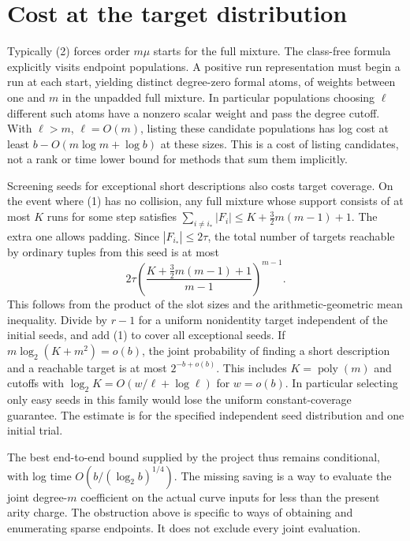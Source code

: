 \documentclass[11pt]{article}
\begin{document}
\section{Cost at the target distribution}
Typically (2) forces order $m\mu$ starts for the full mixture. The
class-free formula explicitly visits endpoint populations. A positive
run representation must begin a run at each start, yielding distinct
degree-zero formal atoms, of weights between one and $m$ in the
unpadded full mixture. In particular populations choosing $\ell$
different such atoms have a nonzero scalar weight and pass the degree
cutoff. With $\ell>m$, $\ell=O(m)$, listing these candidate populations
has log cost at least $b-O(m\log m+\log b)$ at these sizes. This is
a cost of listing candidates, not a rank or time lower bound for
methods that sum them implicitly.

Screening seeds for exceptional short descriptions also costs target
coverage. On the event where (1) has no collision, any full mixture
whose support consists of at most $K$ runs for some step satisfies
$\sum_{i\ne i_*}|F_i|\le K+\tfrac32m(m-1)+1$. The extra one allows
padding. Since $|F_{i_*}|\le2\tau$, the total number of targets
reachable by ordinary tuples from this seed is at most
\[
     2\tau\left(\frac{K+\tfrac32m(m-1)+1}{m-1}\right)^{m-1} .
\]
This follows from the product of the slot sizes and the
arithmetic-geometric mean inequality. Divide by $r-1$ for a uniform
nonidentity target independent of the initial seeds, and add (1)
to cover all exceptional seeds. If $m\log_2(K+m^2)=o(b)$, the joint
probability of finding a short description and a reachable target
is at most $2^{-b+o(b)}$. This includes $K=\operatorname{poly}(m)$
and cutoffs with $\log_2 K=O(w/\ell+\log\ell)$ for $w=o(b)$.
In particular selecting only easy seeds in this family would lose
the uniform constant-coverage guarantee. The estimate is for the
specified independent seed distribution and one initial trial.

The best end-to-end bound supplied by the project thus remains
conditional, with log time $O(b/(\log_2 b)^{1/4})$. The missing
saving is a way to evaluate the joint degree-$m$ coefficient on
the actual curve inputs for less than the present arity charge.
The obstruction above is specific to ways of obtaining and
enumerating sparse endpoints. It does not exclude every joint evaluation.
\end{document}
